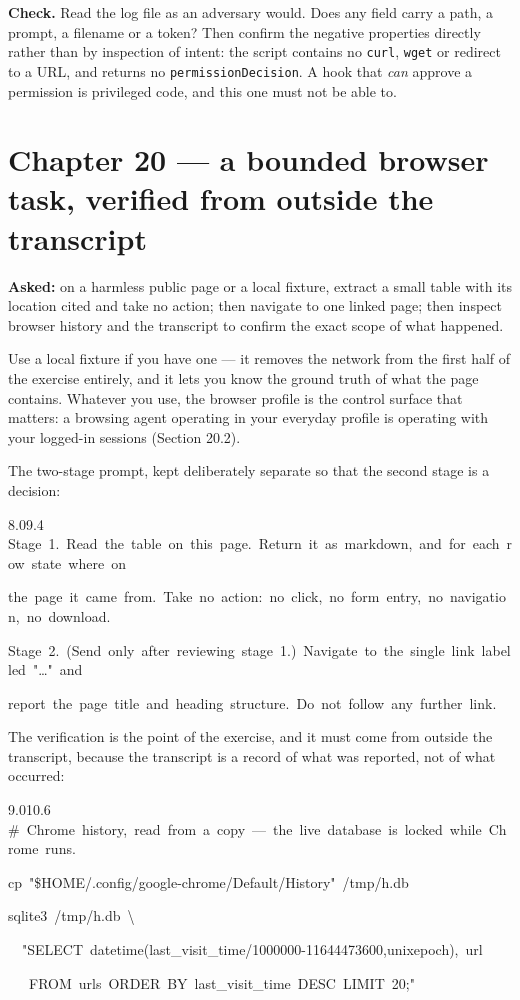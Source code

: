 \documentclass[11pt,a4paper,twoside,openany]{book}
\newcommand{\cl}[1]{\noindent\mbox{#1}\par}
\begin{document}
\textbf{Check.} Read the log file as an adversary would. Does any field carry a path, a prompt, a filename or a token? Then confirm the negative properties directly rather than by inspection of intent: the script contains no \texttt{curl}, \texttt{wget} or redirect to a URL, and returns no \texttt{permission\allowbreak{}Decision}. A hook that \emph{can} approve a permission is privileged code, and this one must not be able to.


\FloatBarrier
\section*{Chapter 20 — a bounded browser task, verified from outside the transcript}

\textbf{Asked:} on a harmless public page or a local fixture, extract a small table with its location cited and take no action; then navigate to one linked page; then inspect browser history and the transcript to confirm the exact scope of what happened.


Use a local fixture if you have one — it removes the network from the first half of the exercise entirely, and it lets you know the ground truth of what the page contains. Whatever you use, the browser profile is the control surface that matters: a browsing agent operating in your everyday profile is operating with your logged-in sessions (Section 20.2).


The two-stage prompt, kept deliberately separate so that the second stage is a decision:


\begin{codeblock}{8.0}{9.4}
\cl{Stage~1.~Read~the~table~on~this~page.~Return~it~as~markdown,~and~for~each~row~state~where~on}
\cl{the~page~it~came~from.~Take~no~action:~no~click,~no~form~entry,~no~navigation,~no~download.}
\cl{}
\cl{Stage~2.~(Send~only~after~reviewing~stage~1.)~Navigate~to~the~single~link~labelled~"…"~and}
\cl{report~the~page~title~and~heading~structure.~Do~not~follow~any~further~link.}
\end{codeblock}

The verification is the point of the exercise, and it must come from outside the transcript, because the transcript is a record of what was reported, not of what occurred:


\begin{codeblock}{9.0}{10.6}
\cl{\#~Chrome~history,~read~from~a~copy~—~the~live~database~is~locked~while~Chrome~runs.}
\cl{cp~"\$HOME/.config/google-chrome/Default/History"~/tmp/h.db}
\cl{sqlite3~/tmp/h.db~\textbackslash{}}
\cl{~~"SELECT~datetime(last\_visit\_time/1000000-11644473600,\textquotesingle{}unixepoch\textquotesingle{}),~url}
\cl{~~~FROM~urls~ORDER~BY~last\_visit\_time~DESC~LIMIT~20;"}
\end{codeblock}
\end{document}
